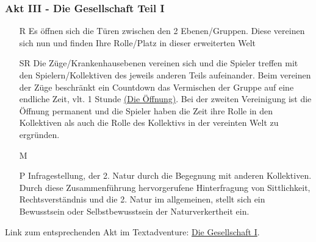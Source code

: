 \documentclass[a4paper, 12pt]{scrartcl}
\begin{document}
    \subsubsection{Akt III - Die Gesellschaft Teil I}
    \begin{itemize}
	\item[R] Es \"offnen sich die T\"uren zwischen den 2 Ebenen/Gruppen. Diese vereinen sich nun und finden Ihre Rolle/Platz in dieser erweiterten \glqq Welt\grqq{}
	\item[SR] Die Z\"uge/Krankenhausebenen vereinen sich und die Spieler treffen mit den Spielern/Kollektiven des jeweils anderen Teils aufeinander. 
    Beim vereinen der Z\"uge beschr\"ankt ein Countdown das Vermischen der Gruppe auf eine endliche Zeit, vlt. 1 Stunde \hyperref[die-öffnung]{(Die Öffnung)}. 
    Bei der zweiten Vereinigung ist die \"Offnung permanent und die Spieler haben die Zeit ihre Rolle in den Kollektiven als auch die Rolle des Kollektivs in der vereinten Welt zu ergr\"unden.
	\item[M]
	\item[P] Infragestellung, der 2. Natur durch die Begegnung mit anderen Kollektiven.
	Durch diese Zusammenf\"uhrung hervorgerufene Hinterfragung von Sittlichkeit, Rechtsverst\"andnis und die 2. Natur im allgemeinen, stellt sich ein Bewusstsein oder Selbstbewusstsein der Naturverkertheit ein. 
    \end{itemize}
    Link zum entsprechenden Akt im Textadventure: \hyperref[die-gesellschaft]{Die Gesellschaft I}.
\end{document}

